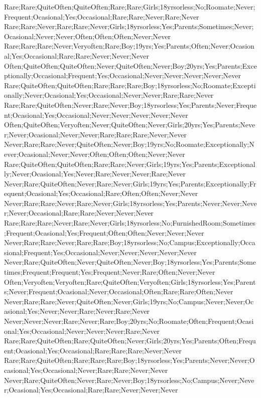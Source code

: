 Rare;Rare;QuiteOften;QuiteOften;Rare;Rare;Girls;18yrsorless;No;Roomate;Never;Frequent;Ocasional;Yes;Occasional;Rare;Rare;Never;Rare;Never
Rare;Rare;Never;Rare;Rare;Never;Girls;18yrsorless;Yes;Parents;Sometimes;Never;Ocasional;Never;Never;Often;Often;Often;Never;Never
Rare;Rare;Rare;Never;Veryoften;Rare;Boy;19yrs;Yes;Parents;Often;Never;Ocasional;Yes;Occasional;Rare;Rare;Never;Never;Never
Often;QuiteOften;QuiteOften;Never;QuiteOften;Never;Boy;20yrs;Yes;Parents;Exceptionally;Occasional;Frequent;Yes;Occasional;Never;Never;Never;Never;Never
Rare;QuiteOften;QuiteOften;Rare;Rare;Rare;Boy;18yrsorless;No;Roomate;Exceptionally;Never;Ocasional;Yes;Occasional;Never;Never;Rare;Rare;Never
Rare;Rare;QuiteOften;Never;Rare;Never;Boy;18yrsorless;Yes;Parents;Never;Frequent;Ocasional;Yes;Occasional;Never;Never;Never;Never;Never
Often;QuiteOften;Veryoften;Never;QuiteOften;Never;Girls;20yrs;Yes;Parents;Never;Never;Ocasional;Never;Never;Rare;Rare;Rare;Never;Never
Never;Rare;Rare;Never;QuiteOften;Never;Boy;19yrs;No;Roomate;Exceptionally;Never;Ocasional;Never;Never;Often;Often;Often;Never;Never
Rare;QuiteOften;QuiteOften;Rare;Rare;Never;Girls;19yrs;Yes;Parents;Exceptionally;Never;Ocasional;Yes;Never;Rare;Never;Never;Rare;Never
Never;Rare;QuiteOften;Never;Rare;Never;Girls;19yrs;Yes;Parents;Exceptionally;Frequent;Ocasional;Yes;Occasional;Rare;Often;Often;Never;Never
Never;Rare;Rare;Never;Rare;Never;Girls;18yrsorless;Yes;Parents;Never;Never;Never;Never;Occasional;Rare;Rare;Never;Never;Never
Rare;Rare;Rare;Never;Rare;Never;Girls;18yrsorless;No;FurnishedRoom;Sometimes;Frequent;Ocasional;Yes;Frequent;Often;Often;Never;Never;Never
Never;Rare;Rare;Never;Rare;Rare;Boy;18yrsorless;No;Campus;Exceptionally;Occasional;Frequent;Yes;Occasional;Never;Never;Never;Never;Never
Never;Rare;QuiteOften;Never;QuiteOften;Never;Boy;18yrsorless;Yes;Parents;Sometimes;Frequent;Frequent;Yes;Frequent;Never;Rare;Often;Never;Never
Often;Veryoften;Veryoften;Rare;QuiteOften;Veryoften;Girls;18yrsorless;Yes;Parents;Never;Frequent;Ocasional;Never;Occasional;Often;Rare;Rare;Often;Never
Never;Rare;Rare;Never;QuiteOften;Never;Girls;19yrs;No;Campus;Never;Never;Ocasional;Yes;Never;Never;Rare;Never;Rare;Never
Never;Never;Never;Rare;Never;Rare;Boy;20yrs;No;Roomate;Often;Frequent;Ocasional;Yes;Occasional;Never;Never;Never;Rare;Never
Rare;Rare;QuiteOften;Rare;QuiteOften;Never;Girls;20yrs;Yes;Parents;Often;Frequent;Ocasional;Yes;Occasional;Rare;Rare;Rare;Never;Never
Rare;Rare;QuiteOften;Rare;Rare;Rare;Boy;18yrsorless;Yes;Parents;Never;Never;Ocasional;Yes;Occasional;Never;Rare;Rare;Never;Never
Never;Rare;QuiteOften;Never;Rare;Never;Boy;18yrsorless;No;Campus;Never;Never;Ocasional;Yes;Occasional;Rare;Rare;Never;Never;Never
